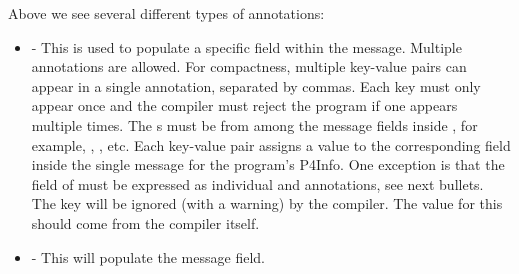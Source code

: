 \documentclass[11pt]{article}
\begin{document}
{%
\noindent{}Above we see several different types of annotations:%

\begin{itemize}%

\item{}
 - This is used to populate a specific field within the 
message. Multiple  annotations are allowed. For compactness,
multiple key-value pairs can appear in a single  annotation,
separated by commas. Each key must only appear once and the compiler must
reject the program if one appears multiple times. The s must be from
among the message fields inside , for example, , ,
etc. Each key-value pair assigns a value to the corresponding field inside the
single  message for the program's P4Info. One exception is that the
 field of  must be expressed as individual
 and  annotations, see next bullets. The key  will
be ignored (with a warning) by the compiler. The value for this should come
from the compiler itself.%

\item{}
 - This will populate the  message field.%


\end{itemize}}
\end{document}
